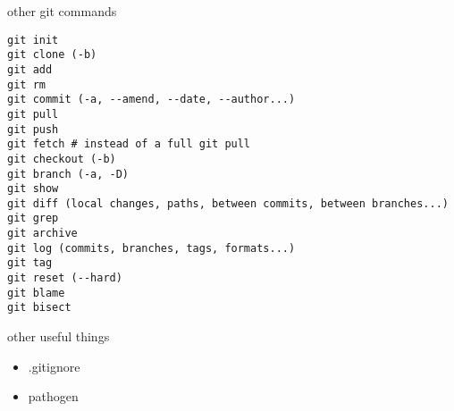 \documentclass[landscape]{slides}
\begin{document}
\begin{slide}
other git commands
\begin{verbatim}
git init
git clone (-b)
git add
git rm
git commit (-a, --amend, --date, --author...)
git pull
git push
git fetch # instead of a full git pull
git checkout (-b)
git branch (-a, -D)
git show
git diff (local changes, paths, between commits, between branches...)
git grep
git archive
git log (commits, branches, tags, formats...)
git tag
git reset (--hard)
git blame
git bisect
\end{verbatim}
\end{slide}

\begin{slide}
other useful things

\begin{itemize}
\item{} .gitignore
\item{} pathogen
\end{itemize}
\end{slide}
\end{document}
